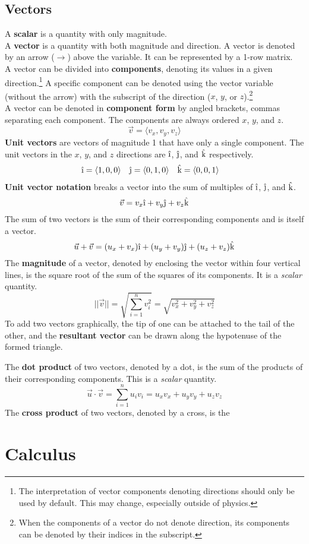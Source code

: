 \documentclass[../AP_Physics_C/mech]{subfiles}
\begin{document}
			\subsection{Vectors}
				A \textbf{scalar} is a quantity with only magnitude. \\
				A \textbf{vector} is a quantity with both magnitude and direction. A vector is denoted by an arrow ($\to$) above the variable. It can be represented by a 1-row matrix. \\
				A vector can be divided into \textbf{components}, denoting its values in a given direction.\footnote{The interpretation of vector components denoting directions should only be used by default. This may change, especially outside of physics.} A specific component can be denoted using the vector variable (without the arrow) with the subscript of the direction ($x$, $y$, or $z$).\footnote{When the components of a vector do not denote direction, its components can be denoted by their indices in the subscript.} \\
				A vector can be denoted in \textbf{component form} by angled brackets, commas separating each component. The components are always ordered $x$, $y$, and $z$. \\
				\[\vec{v} = \langle v_x, v_y, v_z \rangle\]
				\textbf{Unit vectors} are vectors of magnitude 1 that have only a single component. The unit vectors in the $x$, $y$, and $z$ directions are $\iv$, $\jv$, and $\text{\^k}$ respectively.
				\begin{align*}
					\iv &= \langle 1, 0, 0 \rangle & 
						\jv &= \langle 0, 1, 0 \rangle & 
						\kv &= \langle 0, 0, 1 \rangle
				\end{align*}
				\textbf{Unit vector notation} breaks a vector into the sum of multiples of $\iv$, $\jv$, and $\text{\^k}$.
				\[\vec{v} = v_x\iv + v_y\jv + v_z\kv\]
				The sum of two vectors is the sum of their corresponding components and is itself a vector.
				\[\vec{u} + \vec{v} = (u_x + v_x)\iv + (u_y + v_y)\jv + (u_z + v_z)\kv\]
				The \textbf{magnitude} of a vector, denoted by enclosing the vector within four vertical lines, is the square root of the sum of the squares of its components. It is a \emph{scalar} quantity.
				\[||\vec{v}|| = \sqrt{\sum_{i = 1}^n v_i^2} = \sqrt{v_x^2 + v_y^2 + v_z^2}\]
				To add two vectors graphically, the tip of one can be attached to the tail of the other, and the \textbf{resultant vector} can be drawn along the hypotenuse of the formed triangle.
				\begin{center}
				\end{center}
				The \textbf{dot product} of two vectors, denoted by a dot, is the sum of the products of their corresponding components. This is a \emph{scalar} quantity.
				\[\vec{u} \cdot \vec{v} = \sum_{i = 1}^n u_iv_i= u_xv_x + u_yv_y + u_zv_z\]
				The \textbf{cross product} of two vectors, denoted by a cross, is the 
		\section{Calculus}
\end{document}
